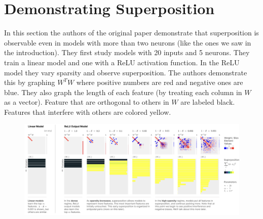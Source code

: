 \documentclass{article} %
\begin{document}
\section{Demonstrating Superposition}

In this section the authors of the original paper demonstrate that superposition
is observable even in models with more than two neurons (like the ones we saw in
the introduction). They first study models with 20 inputs and 5 neurons. They
train a linear model and one with a ReLU activation function. In the ReLU model
they vary sparsity and observe superposition.\newline\newline
The authors demonstrate this by graphing $W^TW$ where positive numbers are red
and negative ones are blue. They also graph the length of each feature (by treating
each column in $W$ as a vector). Feature that are orthogonal to others in $W$ are
labeled black. Features that interfere with others are colored yellow.

\begin{figure}[h]
    \centering
    \includegraphics[width=1\linewidth]{demonstrating_superposition/images/anthropic_section3.png}
    \captionsetup{font=footnotesize} %
    \label{fig:section1_replication}
\end{figure}




\end{document}
